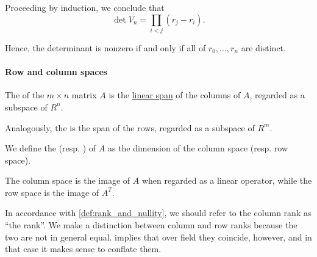 \begin{example}
  Proceeding by induction, we conclude that
  \begin{equation}\label{eq:ex:vandermonde_matrix/determinant}
    \det V_n = \prod_{i < j} (r_j - r_i).
  \end{equation}

  Hence, the determinant is nonzero if and only if all of \( r_0, \ldots, r_n \) are distinct.
\end{example}

\paragraph{Row and column spaces}

\begin{definition}\label{def:column_and_row_spaces}
  The  of the \( m \times n \) matrix \( A \) is the \hyperref[def:module/submodel]{linear span} of the columns of \( A \), regarded as a subspace of \( R^n \).

  Analogously, the  is the span of the rows, regarded as a subspace of \( R^m \).

  We define the  (resp. ) of \( A \) as the dimension of the column space (resp. row space).
\end{definition}
\begin{comments}
  \item The column space is the image of \( A \) when regarded as a linear operator, while the row space is the image of \( A^T \).

  \item In accordance with \cref{def:rank_and_nullity}, we should refer to the column rank as \enquote{the rank}. We make a distinction between column and row ranks because the two are not in general equal.  implies that over field they coincide, however, and in that case it makes sense to conflate them.
\end{comments}

